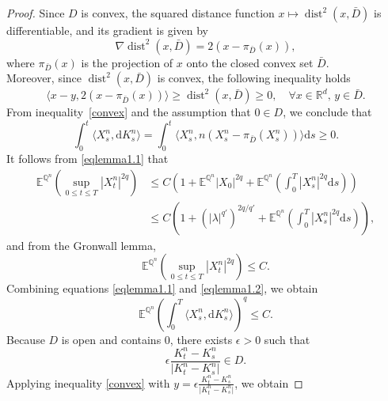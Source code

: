 \documentclass[11pt,amsfonts]{article}
\theoremstyle{plain}
\theoremstyle{assumpstyle}
\numberwithin{equation}{section}
\numberwithin{theorem}{section}
\numberwithin{proposition}{section}
\numberwithin{definition}{section}
\numberwithin{remark}{section}
\numberwithin{corollary}{section}
\numberwithin{lemma}{section}
\begin{document}
\begin{proof}
Since $ D $ is convex, the squared distance function $ x \mapsto \operatorname{dist}^2(x, \bar{D}) $ is differentiable, and its gradient is given by
\begin{equation*}
\nabla \operatorname{dist}^2(x, \bar{D}) = 2(x - \pi_{\bar{D}}(x)),
\end{equation*}
where $ \pi_{\bar{D}}(x) $ is the projection of $ x $ onto the closed convex set $ \bar{D} $.\\ Moreover, since $ \operatorname{dist}^2(x, \bar{D}) $ is convex, the following inequality holds
\begin{equation}\label{convex}
\langle x - y, 2(x - \pi_{\bar{D}}(x)) \rangle \geq \operatorname{dist}^2(x, \bar{D}) \geq 0, \quad \forall x \in \mathbb{R}^d,\, y \in \bar{D}.
\end{equation}
From inequality~\eqref{convex} and the assumption that $ 0 \in D $, we conclude that
\begin{equation*}
\displaystyle\int_{0}^{t}\langle X^n_s, \mathrm{d}K^n_s \rangle = \displaystyle\int_{0}^{t}\langle X^n_s, n(X^n_s-\pi_{\bar{D}}(X^n_s) ) \rangle \mathrm{d}s \geq 0.
\end{equation*}
It follows from \eqref{eqlemma1.1} that
\begin{align*}
\mathbb{E}^{\mathbb{Q}^n}\left( \sup_{ 0 \leq t \leq T} |X^n_t|^{2q} \right) &\leq C \left(1+\mathbb{E}^{\mathbb{Q}^n}|X_0|^{2q}+\mathbb{E}^{\mathbb{Q}^n}\left( \int_{0}^{T} |X^n_s|^{2q} \mathrm{d}s \right) \right) \\
&\leq C \left(1+(|\lambda|^{q'})^{2q/q'}+\mathbb{E}^{\mathbb{Q}^n}\left( \int_{0}^{T} |X^n_s|^{2q} \mathrm{d}s \right) \right),
\end{align*}
and from the Gronwall lemma,
\begin{equation}\label{eqlemma1.2}
\mathbb{E}^{\mathbb{Q}^n}\left( \sup_{ 0 \leq t \leq T} |X^n_t|^{2q} \right) \leq C.
\end{equation}
Combining equations \eqref{eqlemma1.1} and \eqref{eqlemma1.2}, we obtain 
\begin{equation}\label{eqlemma1.3}
\mathbb{E}^{\mathbb{Q}^n}\left( \displaystyle\int_{0}^{T}\langle X^n_s, \mathrm{d}K^n_s \rangle\right)^q \leq C.
\end{equation}
Because $ D $ is open and contains $ 0 $, there exists $ \epsilon > 0 $ such that
\begin{equation*}
\epsilon \frac{K^n_t - K^n_s}{\lvert K^n_t - K^n_s \rvert} \in D.
\end{equation*}
Applying inequality \eqref{convex} with $ y = \epsilon \frac{K^n_t - K^n_s}{\lvert K^n_t - K^n_s \rvert} $, we obtain

\end{proof}
\end{document}
